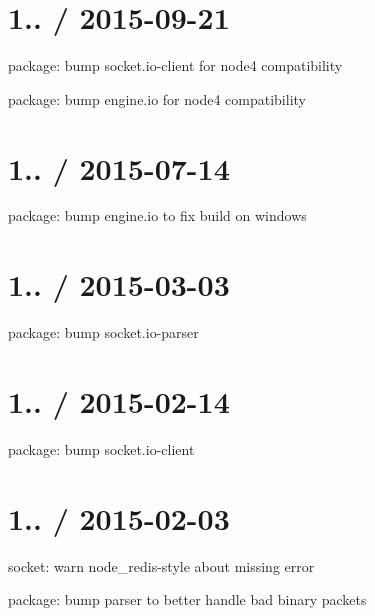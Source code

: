 \section*{1.. / 2015-\/09-\/21 }


\begin{DoxyItemize}
\item package\+: bump {\ttfamily socket.\+io-\/client} for node4 compatibility
\item package\+: bump {\ttfamily engine.\+io} for node4 compatibility
\end{DoxyItemize}

\section*{1.. / 2015-\/07-\/14 }


\begin{DoxyItemize}
\item package\+: bump {\ttfamily engine.\+io} to fix build on windows
\end{DoxyItemize}

\section*{1.. / 2015-\/03-\/03 }


\begin{DoxyItemize}
\item package\+: bump {\ttfamily socket.\+io-\/parser}
\end{DoxyItemize}

\section*{1.. / 2015-\/02-\/14 }


\begin{DoxyItemize}
\item package\+: bump {\ttfamily socket.\+io-\/client}
\end{DoxyItemize}

\section*{1.. / 2015-\/02-\/03 }


\begin{DoxyItemize}
\item socket\+: warn node\+\_\+redis-\/style about missing {\ttfamily error}
\item package\+: bump parser to better handle bad binary packets
\end{DoxyItemize}


